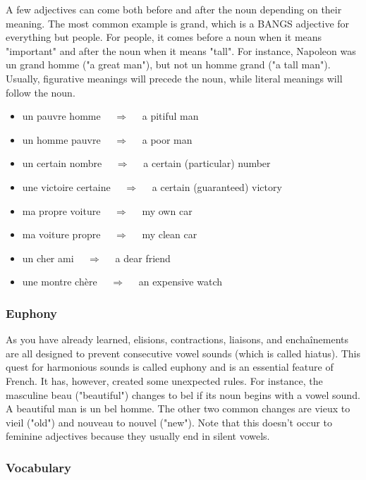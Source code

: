 A few adjectives can come both before and after the noun depending on their meaning. The most common example is grand, which is a BANGS adjective for everything but people. For people, it comes before a noun when it means "important" and after the noun when it means "tall". For instance, Napoleon was un grand homme ("a great man"), but not un homme grand ("a tall man").  Usually, figurative meanings will precede the noun, while literal meanings will follow the noun.

\begin{itemize}
  \item  un pauvre homme $\quad\Rightarrow\quad$ a pitiful man
  \item  un homme pauvre $\quad\Rightarrow\quad$ a poor man
  \item  un certain nombre $\quad\Rightarrow\quad$ a certain (particular) number
  \item  une victoire certaine $\quad\Rightarrow\quad$ a certain (guaranteed) victory
  \item  ma propre voiture $\quad\Rightarrow\quad$ my own car
  \item  ma voiture propre $\quad\Rightarrow\quad$ my clean car
  \item  un cher ami $\quad\Rightarrow\quad$ a dear friend
  \item  une montre chère $\quad\Rightarrow\quad$ an expensive watch
\end{itemize}

\subsubsection{Euphony}

As you have already learned, elisions, contractions, liaisons, and enchaînements are all designed to prevent consecutive vowel sounds (which is called hiatus). This quest for harmonious sounds is called euphony and is an essential feature of French. It has, however, created some unexpected rules.  For instance, the masculine beau ("beautiful") changes to bel if its noun begins with a vowel sound. A beautiful man is un bel homme. The other two common changes are vieux to vieil ("old") and nouveau to nouvel ("new").  Note that this doesn't occur to feminine adjectives because they usually end in silent vowels.
    
\subsubsection{Vocabulary}

